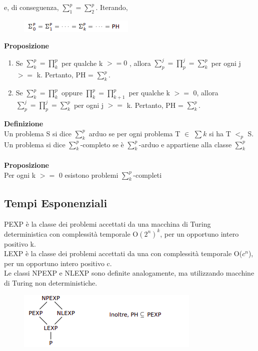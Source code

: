 e, di conseguenza,  $\sum_{1}^p = \sum_{2}^p$. Iterando,

\begin{figure}[htp]
    \centering
    \includegraphics[scale=0.9]{tesi_stile/img/foto10cap15.png}
\end{figure}
\newpage
\textbf{Proposizione}\\
\begin{enumerate}
    \item Se $\sum_{k}^p = \prod_{k}^p$ per qualche k $>= 0$ , allora $\sum_{p}^j = \prod_{p}^j = \sum_{k}^p$ per ogni j $>=$ k. Pertanto, PH = $\sum_{k}^p$.
    
    \item  Se $\sum_{k}^p = \prod_{k}^p$ oppure $\prod_{k}^{p} = \prod_{k+1}^{p}$ per qualche k $>=$ 0, allora $\sum_{p}^j = \prod_{p}^j = \sum_{k}^p$ per ogni j $>=$ k. Pertanto, PH = $\sum_{k}^p$.
    
\end{enumerate}
\textbf{Definizione}\\
Un problema S si dice $\sum_{k}^p$ arduo se per ogni problema T $\in$ $\sum k$ si ha T $<_p$ S. Un problema si dice  $\sum_{k}^{p}$-completo se è $\sum_{k}^{p}$-arduo e appartiene alla classe $\sum_{k}^{p}$
 \\\\\textbf{Proposizione}\\
Per ogni k $>=$ 0 esistono problemi  $\sum_{k}^{p}$-completi
\subsection{Tempi Esponenziali}
PEXP è la classe dei problemi accettati da una macchina di Turing deterministica con complessità temporale O$(2^n)^k$, per un opportuno intero positivo k.
\\LEXP è la classe dei problemi accettati da una con complessità temporale O($c^n$), per un opportuno intero positivo c.
\\Le classi NPEXP e NLEXP sono definite analogamente, ma utilizzando macchine di Turing non deterministiche.
\begin{figure}[htp]
    \centering
    \includegraphics[scale=0.9]{tesi_stile/img/foto11cap15.png}
\end{figure}